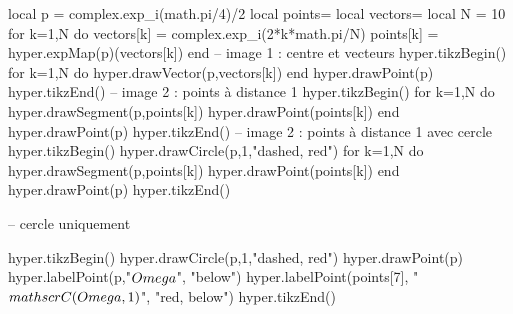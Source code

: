 \documentclass[margin=.2cm,multi,tikz]{standalone}
\begin{document}
\begin{luacode*}
local p = complex.exp_i(math.pi/4)/2
local points={}
local vectors={}
local N = 10
for k=1,N do
	vectors[k] = complex.exp_i(2*k*math.pi/N)
	points[k] = hyper.expMap(p)(vectors[k])
end
-- image 1 : centre et vecteurs
hyper.tikzBegin()
for k=1,N do
	hyper.drawVector(p,vectors[k])
end
hyper.drawPoint(p)
hyper.tikzEnd()
-- image 2 : points à distance 1
hyper.tikzBegin()
for k=1,N do
	hyper.drawSegment(p,points[k])
	hyper.drawPoint(points[k])
end
hyper.drawPoint(p)
hyper.tikzEnd()
-- image 2 : points à distance 1 avec cercle
hyper.tikzBegin()
hyper.drawCircle(p,1,"dashed, red")
for k=1,N do
	hyper.drawSegment(p,points[k])
	hyper.drawPoint(points[k])
end
hyper.drawPoint(p)
hyper.tikzEnd()

-- cercle uniquement

hyper.tikzBegin()
hyper.drawCircle(p,1,"dashed, red")
hyper.drawPoint(p)
hyper.labelPoint(p,"$\\Omega$", "below")
hyper.labelPoint(points[7], "$\\mathscr  C(\\Omega, 1)$", "red, below")
hyper.tikzEnd()

\end{luacode*}
\end{document}
